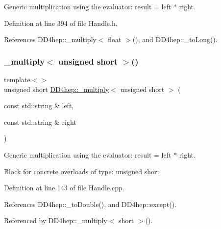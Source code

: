 Generic multiplication using the evaluator\+: result = left $\ast$ right. 



Definition at line 394 of file Handle.\+h.



References D\+D4hep\+::\+\_\+multiply$<$ float $>$(), and D\+D4hep\+::\+\_\+to\+Long().

\hypertarget{group___d_d4_h_e_p___g_e_o_m_e_t_r_y_ga12edc2766d9b966466af98cafef17c90}{}\label{group___d_d4_h_e_p___g_e_o_m_e_t_r_y_ga12edc2766d9b966466af98cafef17c90} 
\subsubsection{\texorpdfstring{\+\_\+multiply$<$ unsigned short $>$()}{\_multiply< unsigned short >()}\hspace{0.1cm}{\footnotesize\ttfamily [1/3]}}
{\footnotesize\ttfamily template$<$$>$ \\
unsigned short \hyperlink{group___d_d4_h_e_p___g_e_o_m_e_t_r_y_gab860c2299e2eb50e537c5079fb0c9c51}{D\+D4hep\+::\+\_\+multiply}$<$ unsigned short $>$ (\begin{DoxyParamCaption}\item[{const std\+::string \&}]{left,  }\item[{const std\+::string \&}]{right }\end{DoxyParamCaption})}



Generic multiplication using the evaluator\+: result = left $\ast$ right. 

Block for concrete overloads of type\+: unsigned short 

Definition at line 143 of file Handle.\+cpp.



References D\+D4hep\+::\+\_\+to\+Double(), and D\+D4hep\+::except().



Referenced by D\+D4hep\+::\+\_\+multiply$<$ short $>$().

\hypertarget{group___d_d4_h_e_p___g_e_o_m_e_t_r_y_ga151db4de4140dfe6b027d2732a7811d1}{}\label{group___d_d4_h_e_p___g_e_o_m_e_t_r_y_ga151db4de4140dfe6b027d2732a7811d1} 
